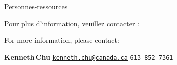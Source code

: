 

\begin{frame}{\vskip -0.1cm \huge Personnes-ressources}

\large

\begin{center}
\begin{multicols}{2}
	\begin{minipage}{4.5cm}
	\vskip -2.6cm
	\begin{center}
	Pour plus d'information,
	\vskip -0.01cm
	\noindent
	veuillez contacter :
	\end{center}
	\end{minipage}
\columnbreak
	\begin{minipage}{4.0cm}
	\vskip -2.5cm
	\begin{center}
	For more information,
	\vskip -0.01cm
	\noindent
	please contact\!:
	\end{center}
	\end{minipage}
\end{multicols}
\end{center}


\begin{center}
\vskip 0.5cm
\textbf{\huge Kenneth\;\,Chu}
\vskip 0.15cm
\href{mailto:kenneth.chu@canada.ca}{\Large\color{darkBlue}\underline{\texttt{kenneth.chu@canada.ca}}}
\vskip 0.24cm
\texttt{\Large 613-852-7361}
\end{center}
%
\end{frame}

%
%
%
%

